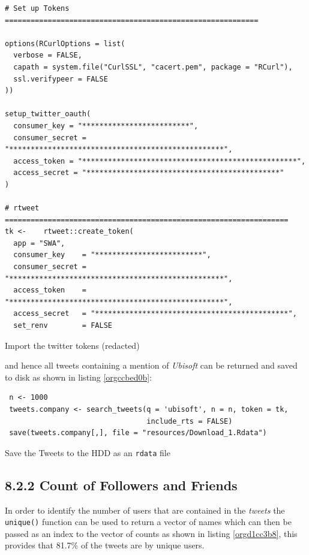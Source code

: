 \documentclass[11pt]{article}
\begin{document}
\begin{listing}[htbp]
\begin{verbatim}
# Set up Tokens ===========================================================

options(RCurlOptions = list(
  verbose = FALSE,
  capath = system.file("CurlSSL", "cacert.pem", package = "RCurl"),
  ssl.verifypeer = FALSE
))

setup_twitter_oauth(
  consumer_key = "*************************",
  consumer_secret = "**************************************************",
  access_token = "**************************************************",
  access_secret = "*********************************************"
)

# rtweet ==================================================================
tk <-    rtweet::create_token(
  app = "SWA",
  consumer_key    = "*************************",
  consumer_secret = "**************************************************",
  access_token    = "**************************************************",
  access_secret   = "*********************************************",
  set_renv        = FALSE
\end{verbatim}
\caption{\label{orga8fb6a4}Import the twitter tokens (redacted)}
\end{listing}

and hence all tweets containing a mention of \emph{Ubisoft} can be returned and saved to disk as shown in listing \ref{orgccbed0b}:

\begin{listing}[htbp]
\begin{verbatim}
 n <- 1000
 tweets.company <- search_tweets(q = 'ubisoft', n = n, token = tk,
                                 include_rts = FALSE)
 save(tweets.company[,], file = "resources/Download_1.Rdata")
\end{verbatim}
\caption{\label{orgccbed0b}Save the Tweets to the HDD as an \texttt{rdata} file}
\end{listing}

\subsection{8.2.2 Count of Followers and Friends}
\label{sec:org778bc00}
In order to identify the number of users that are contained in the \emph{tweets} the
\texttt{unique()} function can be used to return a vector of names which can then be passed as an index to the vector of counts as shown in listing \ref{orgd1cc3b8}, this provides that 81.7\% of the tweets are by unique users.
\end{document}
